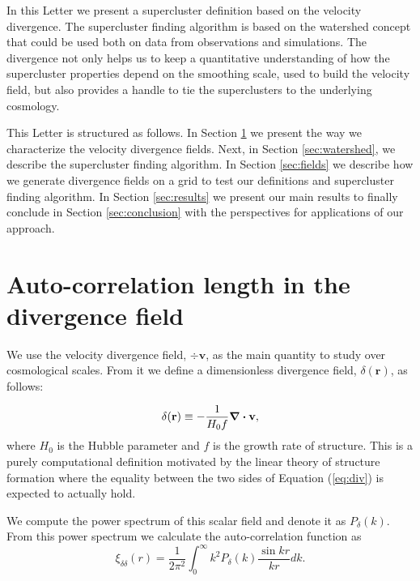 \documentclass[usenatbib]{mnras}
\begin{document}
In this Letter we present a supercluster definition
based on the velocity divergence.
The supercluster finding algorithm is based on the watershed concept that could be used both on data from observations and simulations.
The divergence not only helps us to keep a quantitative understanding of how the supercluster properties depend on the smoothing scale, used to build the velocity field, but also provides a handle to tie the superclusters to the underlying cosmology.

This Letter is structured as follows.
In Section \ref{sec:divergence} we present the way we characterize the velocity divergence fields.
Next, in Section \ref{sec:watershed}, we describe the supercluster finding algorithm.
In Section \ref{sec:fields} we describe how we generate divergence fields on a grid to test our definitions and supercluster finding algorithm.
In Section \ref{sec:results} we present our main results to finally conclude in Section \ref{sec:conclusion} with the perspectives for applications of our approach.








\section{Auto-correlation length in the divergence field}
\label{sec:divergence}
We use the velocity divergence field, $\div \textbf{v}$, as the main quantity to study over cosmological scales.
From it we define a dimensionless divergence field, $\delta(\textbf{r})$, as follows:

\begin{equation}
    \delta (\textbf{r})\equiv -\frac{1}{H_0 f} \div \bf{v},
    \label{eq:div}
\end{equation}
where $H_0$ is the Hubble parameter and $f$ is the growth rate of structure.
This is a purely computational definition motivated by the linear theory of structure formation where the equality between the two sides of Equation (\ref{eq:div}) is expected to actually hold.

We compute the power spectrum of this scalar field and denote it as $P_{\delta}(k)$. 
From this power spectrum we calculate the auto-correlation function as
\begin{equation}
    \xi_{\delta\delta} (r) = \frac{1}{2\pi^2}\int_{0}^{\infty} k^2 P_{\delta}(k)\frac{\sin kr}{kr} dk.
\end{equation}
\end{document}
